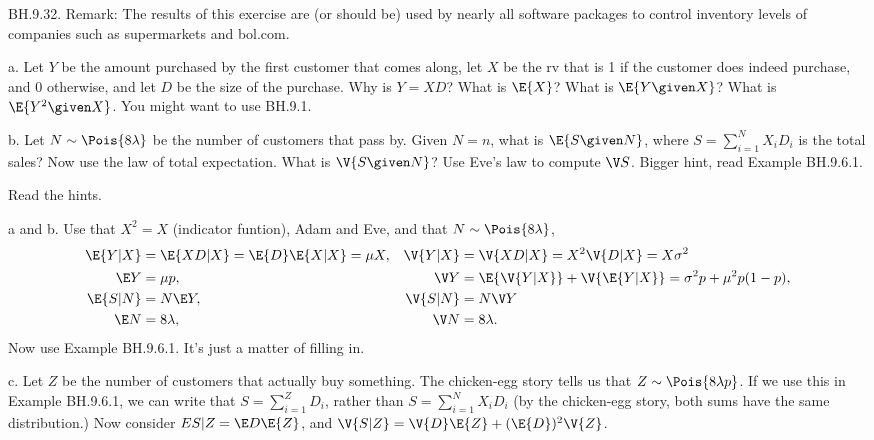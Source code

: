 
\setcounter{theorem}{31}
\begin{exercise} BH.9.32.
Remark: The results of this exercise are (or should be) used by nearly all software packages to control inventory levels of companies such as supermarkets and bol.com.
\begin{hint}
a. Let $Y$ be the amount purchased by the first customer that comes along, let $X$ be the rv that is 1 if the customer does indeed purchase, and 0 otherwise, and let $D$ be the size of the purchase. Why is $Y=XD$? What is $\E{X}$? What is $\E{Y\given X}$? What is $\E{Y^{2}\given X}$. You might want to use BH.9.1.


b. Let $N\sim\Pois{8\lambda}$ be the number of customers that pass by. Given $N=n$, what is $\E{S\given N}$, where $S=\sum_{i=1}^N X_iD_{i}$ is the total sales? Now use the law of total expectation. What is $\V{S\given N}$? Use Eve's law  to compute $\V S$. Bigger hint, read Example BH.9.6.1.
\end{hint}
\begin{solution}
Read the hints.

a and b. Use that $X^{2}=X$ (indicator funtion), Adam and Eve, and that $N\sim \Pois{8\lambda}$,
\begin{align*}
  \E{Y|X}&= \E{XD|X} = \E{D}\E{X|X} = \mu X, &\V{Y|X} &= \V{XD|X} = X^{2} \V{D|X} = X \sigma^2 \\
  \E Y &= \mu p, & \V Y &= \E{\V{Y|X}} + \V{\E{Y|X}} = \sigma^2 p + \mu^{2}p(1-p), \\
  \E{S|N} &= N \E Y, & \V{S|N} &= N \V Y \\
  \E N &= 8 \lambda, & \V N &=  8\lambda.
\end{align*}
Now use Example BH.9.6.1. It's just a matter of filling in.

c.
Let $Z$ be the number of customers that actually buy something.
The chicken-egg story tells us that $Z\sim \Pois{8\lambda p}$.
If we use this in Example BH.9.6.1, we can write that $S = \sum_{i=1}^{Z} D_{i}$, rather than $S=\sum_{i=1}^{N} X_{i}D_{i}$ (by the chicken-egg story, both sums have the same distribution.)
Now consider $E{S|Z}= \E D \E{Z}$, and $\V{S|Z} = \V{D}\E{Z} + (\E{D})^2 \V{Z}$.
\end{solution}
\end{exercise}

